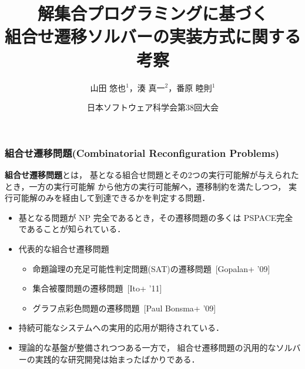 \documentclass[dvipdfmx,11pt]{beamer}
\title[ASPに基づく組合せ遷移ソルバーの実装方式に関する考察]{解集合プログラミングに基づく\\組合せ遷移ソルバーの実装方式に関する考察}
\author[山田 悠也，湊 真一，番原 睦則]{山田 悠也$^1$，湊 真一$^2$，番原 睦則$^1$}
\date{日本ソフトウェア科学会第38回大会}
\institute{1.名古屋大学 大学院情報学研究科 \\ 2.京都大学 大学院情報学研究科}
\begin{document}
\begin{frame}\frametitle{}
  \titlepage
\end{frame}

\begin{frame}\frametitle{組合せ遷移問題(Combinatorial Reconfiguration Problems)}

  \begin{alertblock}{}
    \alert{\bf 組合せ遷移問題}とは，
    基となる組合せ問題とその2つの実行可能解が与えられたとき，一方の実行可能解
    から他方の実行可能解へ，遷移制約を満たしつつ，
    実行可能解のみを経由して到達できるかを判定する問題．
  \end{alertblock}

  \begin{itemize}
    \item 基となる問題が NP 完全であるとき，その遷移問題の多くは
      \alert{PSPACE完全}であることが知られている．
    \item 代表的な組合せ遷移問題
      \begin{itemize}
      \item 命題論理の充足可能性判定問題(SAT)の遷移問題~[Gopalan+ '09]
      \item 集合被覆問題の遷移問題~[Ito+ '11]
      \item グラフ点彩色問題の遷移問題~[Paul Bonsma+ '09]
      \end{itemize}
    \item 持続可能なシステムへの実用的応用が期待されている．
    \item 理論的な基盤が整備されつつある一方で，
          組合せ遷移問題の\alert{汎用的なソルバーの実践的な研究開発は始まったばかりである}．
  \end{itemize}
  
\end{frame}
\end{document}
